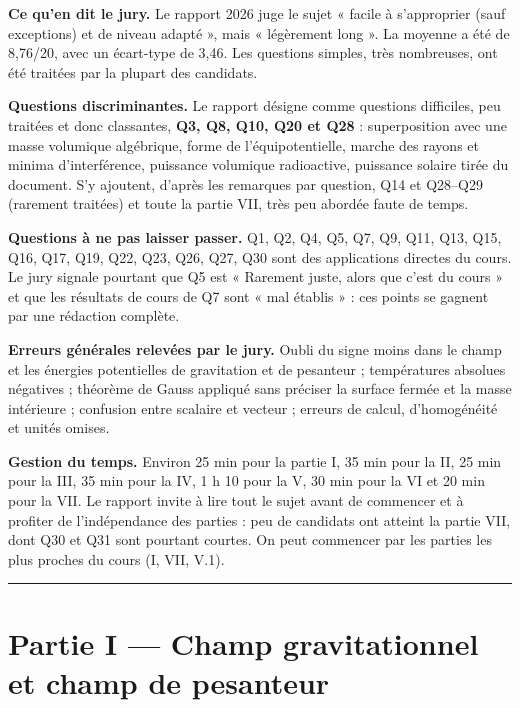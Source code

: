 \documentclass[11pt,a4paper]{article}
\begin{document}
\textbf{Ce qu'en dit le jury.} Le rapport 2026 juge le sujet « facile à s'approprier (sauf exceptions) et de niveau adapté », mais « légèrement long ». La moyenne a été de 8,76/20, avec un écart-type de 3,46. Les questions simples, très nombreuses, ont été traitées par la plupart des candidats.

\textbf{Questions discriminantes.} Le rapport désigne comme questions difficiles, peu traitées et donc classantes, \textbf{Q3, Q8, Q10, Q20 et Q28} : superposition avec une masse volumique algébrique, forme de l'équipotentielle, marche des rayons et minima d'interférence, puissance volumique radioactive, puissance solaire tirée du document. S'y ajoutent, d'après les remarques par question, Q14 et Q28--Q29 (rarement traitées) et toute la partie VII, très peu abordée faute de temps.

\textbf{Questions à ne pas laisser passer.} Q1, Q2, Q4, Q5, Q7, Q9, Q11, Q13, Q15, Q16, Q17, Q19, Q22, Q23, Q26, Q27, Q30 sont des applications directes du cours. Le jury signale pourtant que Q5 est « Rarement juste, alors que c'est du cours » et que les résultats de cours de Q7 sont « mal établis » : ces points se gagnent par une rédaction complète.

\textbf{Erreurs générales relevées par le jury.} Oubli du signe moins dans le champ et les énergies potentielles de gravitation et de pesanteur ; températures absolues négatives ; théorème de Gauss appliqué sans préciser la surface fermée et la masse intérieure ; confusion entre scalaire et vecteur ; erreurs de calcul, d'homogénéité et unités omises.

\textbf{Gestion du temps.} Environ 25 min pour la partie I, 35 min pour la II, 25 min pour la III, 35 min pour la IV, 1 h 10 pour la V, 30 min pour la VI et 20 min pour la VII. Le rapport invite à lire tout le sujet avant de commencer et à profiter de l'indépendance des parties : peu de candidats ont atteint la partie VII, dont Q30 et Q31 sont pourtant courtes. On peut commencer par les parties les plus proches du cours (I, VII, V.1).

\begin{center}\rule{0.5\linewidth}{0.5pt}\end{center}

\hypertarget{partie-i-champ-gravitationnel-et-champ-de-pesanteur}{%
\section{Partie I --- Champ gravitationnel et champ de pesanteur}\label{partie-i-champ-gravitationnel-et-champ-de-pesanteur}}
\end{document}
